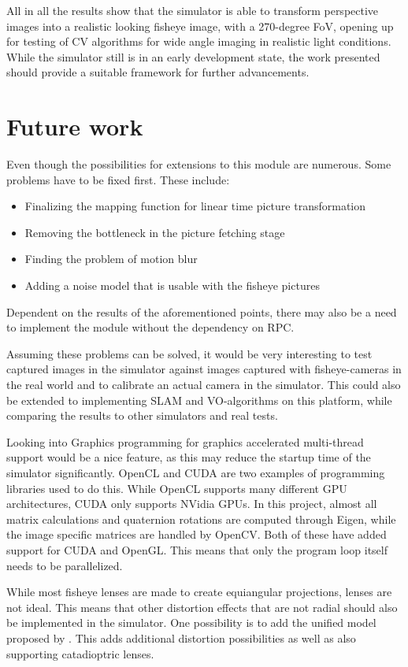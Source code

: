All in all the results show that the simulator is able to transform perspective images into a realistic looking fisheye image, with a 270-degree FoV, opening up for testing of CV algorithms for wide angle imaging in realistic light conditions. While the simulator still is in an early development state, the work presented should provide a suitable framework for further advancements.

\section{Future work}

Even though the possibilities for extensions to this module are numerous. Some problems have to be fixed first. These include:
\begin{itemize}
    \item Finalizing the mapping function for linear time picture transformation
    \item Removing the bottleneck in the picture fetching stage
    \item Finding the problem of motion blur
    \item Adding a noise model that is usable with the fisheye pictures
\end{itemize}

Dependent on the results of the aforementioned points, there may also be a need to implement the module without the dependency on RPC.

Assuming these problems can be solved, it would be very interesting to test captured images in the simulator against images captured with fisheye-cameras in the real world and to calibrate an actual camera in the simulator. This could also be extended to implementing SLAM and VO-algorithms on this platform, while comparing the results to other simulators and real tests.

Looking into Graphics programming for graphics accelerated multi-thread support would be a nice feature, as this may reduce the startup time of the simulator significantly. OpenCL and CUDA are two examples of programming libraries used to do this. While OpenCL supports many different GPU architectures, CUDA only supports NVidia GPUs. In this project, almost all matrix calculations and quaternion rotations are computed through Eigen, while the image specific matrices are handled by OpenCV. Both of these have added support for CUDA and OpenGL. This means that only the program loop itself needs to be parallelized.

While most fisheye lenses are made to create equiangular projections, lenses are not ideal. This means that other distortion effects that are not radial should also be implemented in the simulator. One possibility is to add the unified model proposed by \cite{FisheyeKalibration}. This adds additional distortion possibilities as well as also supporting catadioptric lenses.

